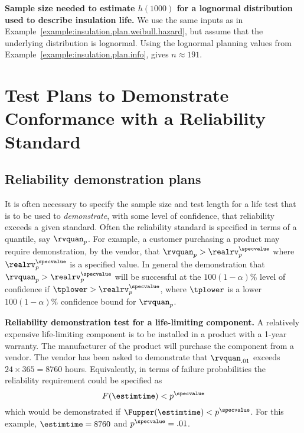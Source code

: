 \begin{example}
\label{example:insulation.plan.lognormal.hazard}
{\bf Sample size needed to estimate $h(1000)$
for a lognormal
distribution used to describe insulation life.}
We use the same inputs
as in Example~\ref{example:insulation.plan.weibull.hazard}, 
but assume that the underlying distribution
is lognormal. Using the lognormal planning values from
Example~\ref{example:insulation.plan.info},
gives  $n \approx 191$.
\end{example}

\section{Test Plans
to Demonstrate Conformance with a Reliability Standard}
\label{section:zero.failures}
\subsection{Reliability demonstration plans}
It is often necessary to specify the sample size and test length for
a life test that is to be used to {\em demonstrate}, with some level of
confidence, that reliability exceeds a given standard.  Often the
reliability standard is specified in terms of a quantile, say
$\rvquan_{p}$.  For example, a customer purchasing a product may
require demonstration, by the vendor, that $\rvquan_{p} >
\realrv_{p}^{\specvalue}$ where $\realrv_{p}^{\specvalue}$ is a
specified value.  In general the demonstration that $\rvquan_{p} >
\realrv_{p}^{\specvalue}$ will be successful at the $100(1-\alpha)\%$
level of confidence if $\tplower > \realrv_{p}^{\specvalue}$, where
$\tplower$ is a lower $100(1-\alpha)\%$ confidence bound for
$\rvquan_{p}$.

\begin{example}
{\bf Reliability demonstration test for
a life-limiting component.}
A relatively expensive life-limiting component is to be installed in a
product with a 1-year warranty. The manufacturer of the product will
purchase the component from a vendor.  The vendor has been asked to
demonstrate that $\rvquan_{.01}$ exceeds $24 \times 365 = 8760$ hours.
Equivalently, in terms of failure probabilities the reliability
requirement could be specified as
\begin{displaymath}
F(\estimtime) < p^{\specvalue}
\end{displaymath}
which would be demonstrated if $\Fupper(\estimtime) < p^{\specvalue}$.
For this example, $\estimtime=8760$ and $p^{\specvalue}=.01$.
\end{example}

